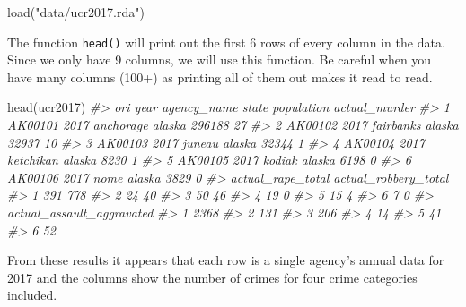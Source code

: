 \documentclass[
]{krantz}
\makeatletter
\newenvironment{Shaded}{\begin{snugshade}}{\end{snugshade}}
\newcommand{\CommentTok}[1]{\textcolor[rgb]{0.37,0.37,0.37}{\textit{#1}}}
\newcommand{\FunctionTok}[1]{\textcolor[rgb]{0,0,0}{#1}}
\newcommand{\NormalTok}[1]{#1}
\newcommand{\StringTok}[1]{\textcolor[rgb]{0.5,0.5,0.5}{#1}}
\newenvironment{kframe}{%
\medskip{}
\setlength{\fboxsep}{.8em}
 \def\at@end@of@kframe{}%
 \ifinner\ifhmode%
  \def\at@end@of@kframe{\end{minipage}}%
  \begin{minipage}{\columnwidth}%
 \fi\fi%
 \def\FrameCommand##1{\hskip\@totalleftmargin \hskip-\fboxsep
 \colorbox{shadecolor}{##1}\hskip-\fboxsep
     \hskip-\linewidth \hskip-\@totalleftmargin \hskip\columnwidth}%
 \MakeFramed {\advance\hsize-\width
   \@totalleftmargin\z@ \linewidth\hsize
   \@setminipage}}%
 {\par\unskip\endMakeFramed%
 \at@end@of@kframe}
\renewenvironment{Shaded}{\begin{kframe}}{\end{kframe}}
\makeatother
\begin{document}
\begin{Shaded}
\begin{Highlighting}[]
\FunctionTok{load}\NormalTok{(}\StringTok{"data/ucr2017.rda"}\NormalTok{)}
\end{Highlighting}
\end{Shaded}

The function \texttt{head()} will print out the first 6 rows
of every column in the data. Since we only have 9 columns,
we will use this function. Be careful when you have many
columns (100+) as printing all of them out makes it read to
read.

\begin{Shaded}
\begin{Highlighting}[]
\FunctionTok{head}\NormalTok{(ucr2017)}
\CommentTok{\#\textgreater{}       ori year agency\_name  state population actual\_murder}
\CommentTok{\#\textgreater{} 1 AK00101 2017   anchorage alaska     296188            27}
\CommentTok{\#\textgreater{} 2 AK00102 2017   fairbanks alaska      32937            10}
\CommentTok{\#\textgreater{} 3 AK00103 2017      juneau alaska      32344             1}
\CommentTok{\#\textgreater{} 4 AK00104 2017   ketchikan alaska       8230             1}
\CommentTok{\#\textgreater{} 5 AK00105 2017      kodiak alaska       6198             0}
\CommentTok{\#\textgreater{} 6 AK00106 2017        nome alaska       3829             0}
\CommentTok{\#\textgreater{}   actual\_rape\_total actual\_robbery\_total}
\CommentTok{\#\textgreater{} 1               391                  778}
\CommentTok{\#\textgreater{} 2                24                   40}
\CommentTok{\#\textgreater{} 3                50                   46}
\CommentTok{\#\textgreater{} 4                19                    0}
\CommentTok{\#\textgreater{} 5                15                    4}
\CommentTok{\#\textgreater{} 6                 7                    0}
\CommentTok{\#\textgreater{}   actual\_assault\_aggravated}
\CommentTok{\#\textgreater{} 1                      2368}
\CommentTok{\#\textgreater{} 2                       131}
\CommentTok{\#\textgreater{} 3                       206}
\CommentTok{\#\textgreater{} 4                        14}
\CommentTok{\#\textgreater{} 5                        41}
\CommentTok{\#\textgreater{} 6                        52}
\end{Highlighting}
\end{Shaded}

From these results it appears that each row is a single
agency's annual data for 2017 and the columns show the
number of crimes for four crime categories included.
\end{document}
